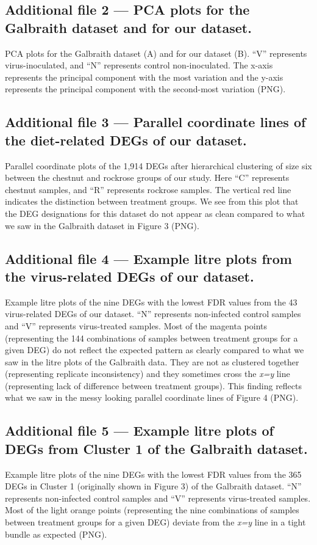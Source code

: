 \documentclass{bmcart}
\begin{document}
\begin{linenumbers}
\begin{backmatter}
  \subsection*{Additional file 2 --- PCA plots for the Galbraith dataset and for our dataset.}
    PCA plots for the Galbraith dataset (A) and for our dataset (B). ``V'' represents virus-inoculated, and ``N'' represents control non-inoculated. The x-axis represents the principal component with the most variation and the y-axis represents the principal component with the second-most variation (PNG).

  \subsection*{Additional file 3 --- Parallel coordinate lines of the diet-related DEGs of our dataset.}
    Parallel coordinate plots of the 1,914 DEGs after hierarchical clustering of size six between the chestnut and rockrose groups of our study. Here ``C'' represents chestnut samples, and ``R'' represents rockrose samples. The vertical red line indicates the distinction between treatment groups. We see from this plot that the DEG designations for this dataset do not appear as clean compared to what we saw in the Galbraith dataset in Figure 3 (PNG).

  \subsection*{Additional file 4 --- Example litre plots from the virus-related DEGs of our dataset.}
    Example litre plots of the nine DEGs with the lowest FDR values from the 43 virus-related DEGs of our dataset. ``N'' represents non-infected control samples and ``V'' represents virus-treated samples. Most of the magenta points (representing the 144 combinations of samples between treatment groups for a given DEG) do not reflect the expected pattern as clearly compared to what we saw in the litre plots of the Galbraith data. They are not as clustered together (representing replicate inconsistency) and they sometimes cross the \textit{x=y} line (representing lack of difference between treatment groups). This finding reflects what we saw in the messy looking parallel coordinate lines of Figure 4 (PNG).

  \subsection*{Additional file 5 --- Example litre plots of DEGs from Cluster 1 of the Galbraith dataset.}
    Example litre plots of the nine DEGs with the lowest FDR values from the 365 DEGs in Cluster 1 (originally shown in Figure 3) of the Galbraith dataset. ``N'' represents non-infected control samples and ``V'' represents virus-treated samples. Most of the light orange points (representing the nine combinations of samples between treatment groups for a given DEG) deviate from the \textit{x=y} line in a tight bundle as expected (PNG).


\end{backmatter}
\end{linenumbers}
\end{document}
